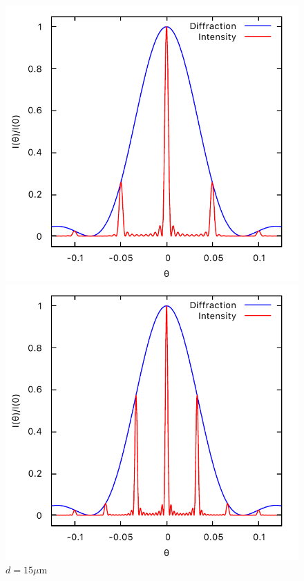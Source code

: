 \documentclass[11pt, twoside]{article}   	%
\theoremstyle{plain}
\theoremstyle{definition}
\begin{document}
\begin{description}
\begin{figure}[htbp]
		\begin{minipage}[t]{0.33\linewidth}
		\centering
		\includegraphics[width=0.9\linewidth]{d=10}
		\caption{$d=10\mu\mathrm{m}$}
		\end{minipage}
		\begin{minipage}[t]{0.33\linewidth}
		\centering
		\includegraphics[width=0.9\linewidth]{d=15}
		\caption{$d=15\mu\mathrm{m}$}
		\end{minipage}

\end{figure}
\end{description}
\end{document}
